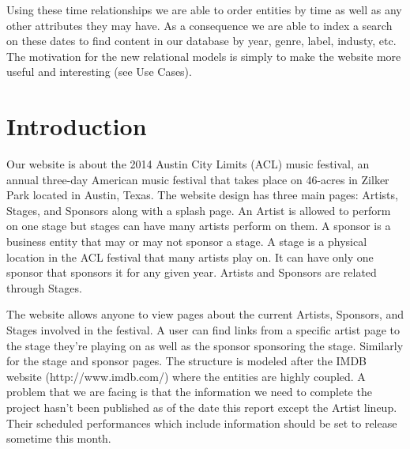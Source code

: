 \documentclass[12pt,english]{scrartcl}
\begin{document}
Using these time relationships we are able to order entities by time as well as any other attributes they may have. As a consequence we are able to index a search on these 
dates to find content in our database by year, genre, label, industy, etc. The motivation for the new relational models is simply to make the website more useful and interesting (see Use Cases).

\section{Introduction}
Our website is about the 2014 Austin City Limits (ACL) music festival, an annual three-day American music festival that takes place on 46-acres in Zilker Park located in Austin, Texas. 
The website design has three main pages: Artists, Stages, and Sponsors along with a splash page. An Artist is allowed to perform on one stage but stages can have many artists perform on them.
A sponsor is a business entity that may or may not sponsor a stage. A stage is a physical location in the ACL festival that many artists play on. 
It can have only one sponsor that sponsors it for any given year. Artists and Sponsors are related through Stages.

The website allows anyone to view pages about the current Artists, Sponsors, and Stages involved in the festival. A user can find links from a specific artist page to the stage they're playing on
as well as the sponsor sponsoring the stage. Similarly for the stage and sponsor pages. The structure is modeled after the IMDB website (http://www.imdb.com/) where the entities are highly coupled.
A problem that we are facing is that the information we need to complete the project hasn't been published as of the date this report except the Artist lineup. Their scheduled performances which 
include information should be set to release sometime this month.
\end{document}
